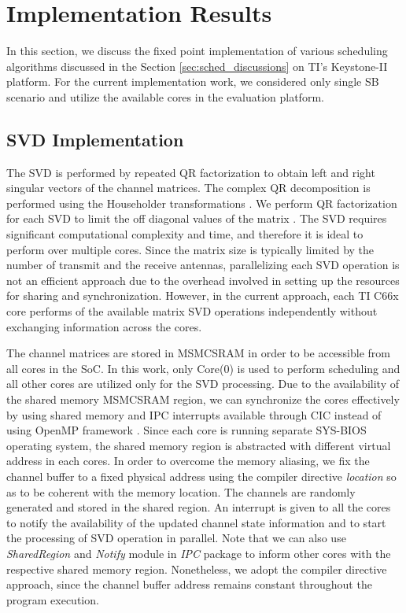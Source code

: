 \documentclass[conference,letterpaper,9pt]{./../IEEEtran}
\begin{document}
\section{Implementation Results}
\label{sec:implementation}
In this section, we discuss the fixed point implementation of various scheduling algorithms discussed in the Section \ref{sec:sched_discussions} on TI's Keystone-II platform. For the current implementation work, we considered only single SB scenario and utilize the available  cores in the evaluation platform. 

\subsection{SVD Implementation}
The SVD is performed by repeated QR factorization to obtain left and right singular vectors of the channel matrices. The complex QR decomposition is performed using the Householder transformations \cite{aft}. We perform  QR factorization for each SVD to limit the off diagonal values of the  matrix . The SVD requires significant computational complexity and time, and therefore it is ideal to perform over multiple cores. Since the matrix size is typically limited by the number of transmit and the receive antennas, parallelizing each SVD operation is not an efficient approach due to the overhead involved in setting up the resources for sharing and synchronization. However, in the current approach, each TI C66x core performs  of the available matrix SVD operations independently without exchanging information across the cores.
	
The channel matrices are stored in \ac{MSMCSRAM} in order to be accessible from all cores in the \ac{SoC}. In this work, only Core(0) is used to perform scheduling and all other cores are utilized only for the SVD processing. Due to the availability of the shared memory \ac{MSMCSRAM} region, we can synchronize the cores effectively by using shared memory and \ac{IPC} interrupts available through \ac{CIC} instead of using OpenMP framework \cite{openmp,ipc,cic}. Since each core is running separate SYS-BIOS operating system, the shared memory region is abstracted with different virtual address in each cores. In order to overcome the memory aliasing, we fix the channel buffer to a fixed physical address using the compiler directive \textit{location} so as to be coherent with the memory location. The channels are randomly generated and stored in the shared region. An interrupt is given to all the cores to notify the availability of the updated channel state information and to start the processing of SVD operation in parallel. Note that we can also use \textit{SharedRegion} and \textit{Notify} module in \textit{IPC} package to inform other cores with the respective shared memory region. Nonetheless, we adopt the compiler directive approach, since the channel buffer address remains constant throughout the program execution.
\end{document}
